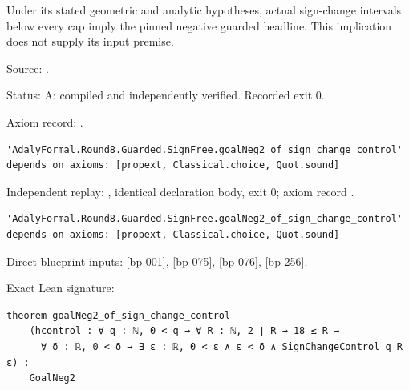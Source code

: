 \begin{theorem}[bp-258]
\label{bp-258}
\leanok
Under its stated geometric and analytic hypotheses, actual sign-change intervals below every cap imply the pinned negative guarded headline. This implication does not supply its input premise.

\par Source: \texttt{}.
\par Status: A: compiled and independently verified. Recorded exit 0.
\par Axiom record: \texttt{}.
\begin{verbatim}
'AdalyFormal.Round8.Guarded.SignFree.goalNeg2_of_sign_change_control' depends on axioms: [propext, Classical.choice, Quot.sound]
\end{verbatim}
\par Independent replay: \texttt{}, identical declaration body, exit 0; axiom record \texttt{}.
\begin{verbatim}
'AdalyFormal.Round8.Guarded.SignFree.goalNeg2_of_sign_change_control' depends on axioms: [propext, Classical.choice, Quot.sound]
\end{verbatim}
\par Direct blueprint inputs: \ref{bp-001}, \ref{bp-075}, \ref{bp-076}, \ref{bp-256}.
\par Exact Lean signature:
\begin{verbatim}
theorem goalNeg2_of_sign_change_control
    (hcontrol : ∀ q : ℕ, 0 < q → ∀ R : ℕ, 2 ∣ R → 18 ≤ R →
      ∀ δ : ℝ, 0 < δ → ∃ ε : ℝ, 0 < ε ∧ ε < δ ∧ SignChangeControl q R ε) :
    GoalNeg2
\end{verbatim}
\end{theorem}

